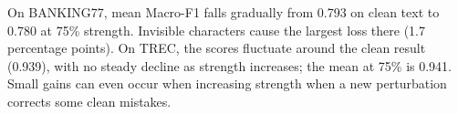 On BANKING77, mean Macro-F1 falls gradually from 0.793 on clean text to 0.780 at 75\% strength. Invisible characters cause the largest loss there (1.7 percentage points). On TREC, the scores fluctuate around the clean result (0.939), with no steady decline as strength increases; the mean at 75\% is 0.941. Small gains can even occur when increasing strength when a new perturbation corrects some clean mistakes.
